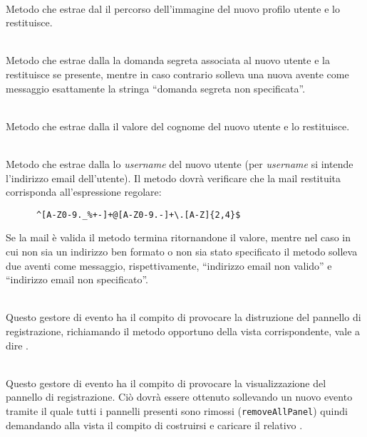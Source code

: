\begin{description}
		\item{}\\
	Metodo che estrae dal  il percorso dell'immagine del nuovo profilo utente e lo restituisce.
	
		\item{}\\
	Metodo che estrae dalla  la domanda segreta associata al nuovo utente e la restituisce se presente, mentre in caso contrario solleva una nuova  avente come messaggio esattamente la stringa ``domanda segreta non specificata''.

	\item{}\\
	Metodo che estrae dalla  il valore del cognome del nuovo utente e lo restituisce.
	

	\item{}\\
	Metodo che estrae dalla  lo \textit{username} del nuovo utente (per \textit{username} si intende l'indirizzo email dell'utente). Il metodo dovrà verificare che la mail restituita corrisponda all'espressione regolare:
\begin{verbatim}
	  ^[A-Z0-9._%+-]+@[A-Z0-9.-]+\.[A-Z]{2,4}$
\end{verbatim}
	
Se la mail è valida il metodo termina ritornandone il valore, mentre nel caso in cui non sia un indirizzo ben formato o non sia stato specificato il metodo solleva due  aventi come messaggio, rispettivamente, ``indirizzo email non valido'' e ``indirizzo email non specificato''.

	\item{}\\
	Questo gestore di evento ha il compito di provocare la distruzione del pannello di registrazione, richiamando il metodo opportuno della vista corrispondente, vale a dire .
	
	\item{}\\
	Questo gestore di evento ha il compito di provocare la visualizzazione del pannello di registrazione. Ciò dovrà essere ottenuto sollevando un nuovo evento tramite il quale tutti i pannelli presenti sono rimossi (\verb'removeAllPanel') quindi demandando alla vista il compito di costruirsi e caricare il relativo .
	

\end{description}

